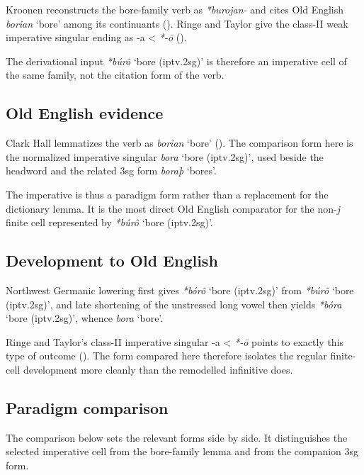 \documentclass[
  british,
  a4paper,
  openany]{book}
\providecommand{\Recon}[1]{\emph{*#1}}
{\catcode`→=\active \global\def→{\ensuremath{\rightarrow}}}
\providecommand{\Recon}[1]{\emph{*#1}}
{\catcode`→=\active \global\def→{\ensuremath{\rightarrow}}}
\begin{document}
Kroonen reconstructs the bore-family verb as \emph{*burojan-} and cites
Old English {\emph{borian}} `bore' among its continuants
(). Ringe and Taylor give
the class-II weak imperative singular ending as -a \textless{}
\emph{*-ō} ().

The derivational input \Recon{búrô} `bore (iptv.2sg)' is therefore an
imperative cell of the same family, not the citation form of the verb.

\subsection{Old English evidence}\label{old-english-evidence-128}

Clark Hall lemmatizes the verb as {\emph{borian}} `bore'
(). The comparison form
here is the normalized imperative singular \emph{bora} `bore
(iptv.2sg)', used beside the headword and the related 3sg form
\emph{boraþ} `bores'.

The imperative is thus a paradigm form rather than a replacement for the
dictionary lemma. It is the most direct Old English comparator for the
non-\emph{j} finite cell represented by \Recon{búrô} `bore (iptv.2sg)'.

\subsection{Development to Old
English}\label{development-to-old-english-128}

Northwest Germanic lowering first gives \Recon{bórô} `bore (iptv.2sg)'
from \Recon{búrô} `bore (iptv.2sg)', and late shortening of the
unstressed long vowel then yields \Recon{bóra} `bore (iptv.2sg)', whence
\emph{bora} `bore'.

Ringe and Taylor's class-II imperative singular -a \textless{}
\emph{*-ō} points to exactly this type of outcome
(). The form
compared here therefore isolates the regular finite-cell development
more cleanly than the remodelled infinitive does.

\subsection{Paradigm comparison}\label{paradigm-comparison-20}

The comparison below sets the relevant forms side by side. It
distinguishes the selected imperative cell from the bore-family lemma
and from the companion 3sg form.
\end{document}

